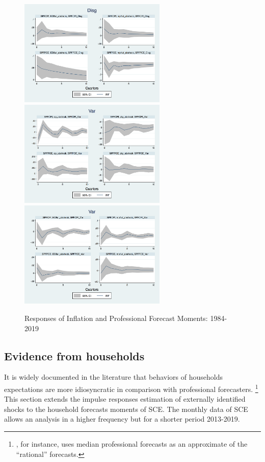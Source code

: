 \documentclass[]{article}
\begin{document}
\begin{figure}[ht]
		\includegraphics[width=7cm]{figures/SPFDisg_ab_ashocks.png} \\
		\smallskip 
		\includegraphics[width=7cm]{figures/SPFVar_ab_ashocks_nmp.png} 
		\includegraphics[width=7cm]{figures/SPFVar_ab_ashocks.png} 
		\caption{Responses of Inflation and Professional Forecast Moments: 1984-2019}
		\label{ReplicateCoibionwholeperiod}
	\end{figure}
	
	
	\subsection{Evidence from households}
	
	It is widely documented in the literature that behaviors of households expectations are more idiosyncratic in comparison with professional forecasters. \footnote{\cite{carroll2003macroeconomic}, for instance, uses median professional forecasts as an approximate of the ``rational'' forecasts.} This section extends the impulse responses estimation of externally identified shocks to the household forecasts moments of SCE.  The monthly data of SCE allows an analysis in a higher frequency but for a shorter period 2013-2019. 
	
\end{document}
